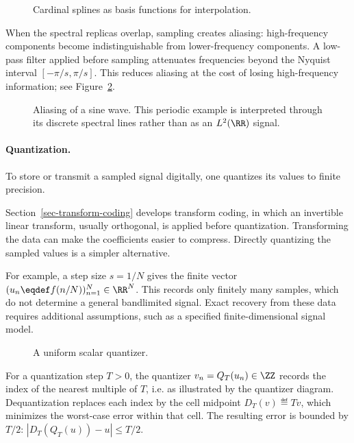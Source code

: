 \begin{figure}[tbp]
\centering
{}
\caption{Cardinal splines as basis functions for interpolation.}
\label{fig-sampling-splines}
\end{figure}



When the spectral replicas overlap, sampling creates aliasing: high-frequency components become indistinguishable from lower-frequency components. A low-pass filter applied before sampling attenuates frequencies beyond the Nyquist interval $[-\pi/s,\pi/s]$. This reduces aliasing at the cost of losing high-frequency information; see Figure~\ref{fig-aliasing}.

\begin{figure}[tbp]
\centering
{}
\caption{Aliasing of a sine wave. This periodic example is interpreted through its discrete spectral lines rather than as an $L^2(\RR)$ signal.}
\label{fig-aliasing}
\end{figure}

   
\paragraph{Quantization.}

To store or transmit a sampled signal digitally, one quantizes its values to finite precision.
  
Section~\ref{sec-transform-coding} develops transform coding, in which an invertible linear transform, usually orthogonal, is applied before quantization. Transforming the data can make the coefficients easier to compress. Directly quantizing the sampled values is a simpler alternative.

For example, a step size $s=1/N$ gives the finite vector $(u_n \eqdef f(n/N))_{n=1}^{N} \in \RR^N$. This records only finitely many samples, which do not determine a general bandlimited signal. Exact recovery from these data requires additional assumptions, such as a specified finite-dimensional signal model.

\begin{figure}[tbp]
\centering
{}
\caption{A uniform scalar quantizer.}
\label{fig-review-shannon-quantizer}
\end{figure}

For a quantization step $T>0$, the quantizer $v_n = Q_T(u_n) \in \ZZ$ records the index of the nearest multiple of $T$, i.e.
as illustrated by the quantizer diagram. Dequantization replaces each index by the cell midpoint $D_T(v) \eqdef T v$, which minimizes the worst-case error within that cell. The resulting error is bounded by $T/2$: $|D_T(Q_T(u))-u| \leq T/2$.
 
